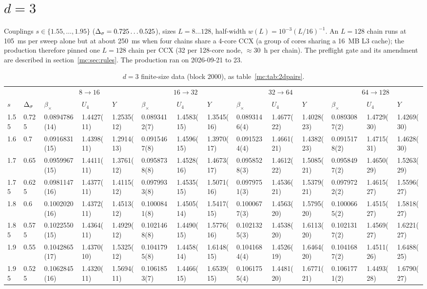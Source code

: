 \section{\texorpdfstring{$d=3$}{d=3}}\label{mc:sec:3d}
Couplings $s\in\{1.55,\dots,1.95\}$ ($\Delta_\sigma=0.725\dots0.525$), sizes $L=8\dots128$, half-width $w(L)=10^{-3}(L/16)^{-1}$. An $L=128$ chain runs at
105~ms per sweep alone but at about 250~ms when four chains share a 4-core CCX (a group of cores sharing a 16~MB L3 cache); the production
therefore pinned one $L=128$ chain per CCX (32 per 128-core node, $\approx30$~h per chain). The preflight gate and its amendment are described in
section~\ref{mc:sec:rules}. The production ran on 2026-09-21 to 23.
\begin{table}\centering\scriptsize
\caption{$d=3$ finite-size data (block 2000), as table~\ref{mc:tab:2dpairs}.}\label{mc:tab:3dpairs}
\begin{tabular}{@{}ll|lll|lll|lll|lll@{}}\toprule
 & & \multicolumn{3}{c|}{$8\to16$} & \multicolumn{3}{c|}{$16\to32$} & \multicolumn{3}{c|}{$32\to64$} & \multicolumn{3}{c}{$64\to128$}\\
$s$ & $\Delta_\sigma$ & $\beta_\times$ & $U_4$ & $Y$ & $\beta_\times$ & $U_4$ & $Y$ & $\beta_\times$ & $U_4$ & $Y$ & $\beta_\times$ & $U_4$ & $Y$ \\\midrule
1.55 & 0.725 & 0.0894786(14) & 1.4427(11) & 1.2535(12) & 0.0893412(7) & 1.4583(15) & 1.3545(16) & 0.0893146(4) & 1.4677(22) & 1.4028(23) & 0.0893087(2) & 1.4729(30) & 1.4269(30) \\
1.6 & 0.7 & 0.0916831(15) & 1.4398(11) & 1.2914(13) & 0.0915467(8) & 1.4596(15) & 1.3970(17) & 0.0915234(4) & 1.4661(21) & 1.4382(23) & 0.0915178(2) & 1.4715(31) & 1.4628(30) \\
1.7 & 0.65 & 0.0959967(15) & 1.4411(11) & 1.3761(12) & 0.0958738(8) & 1.4528(16) & 1.4673(17) & 0.0958528(3) & 1.4612(22) & 1.5085(21) & 0.0958497(2) & 1.4650(29) & 1.5263(29) \\
1.75 & 0.625 & 0.0981147(16) & 1.4377(11) & 1.4115(12) & 0.0979933(8) & 1.4535(15) & 1.5071(16) & 0.0979751(3) & 1.4536(21) & 1.5379(21) & 0.0979722(2) & 1.4615(27) & 1.5596(27) \\
1.8 & 0.6 & 0.1002020(16) & 1.4372(11) & 1.4513(12) & 0.1000841(8) & 1.4505(14) & 1.5417(15) & 0.1000677(3) & 1.4563(20) & 1.5795(20) & 0.1000665(2) & 1.4515(27) & 1.5818(27) \\
1.85 & 0.575 & 0.1022550(15) & 1.4364(11) & 1.4929(12) & 0.1021468(8) & 1.4490(15) & 1.5776(16) & 0.1021325(3) & 1.4538(20) & 1.6113(20) & 0.1021317(2) & 1.4569(27) & 1.6221(27) \\
1.9 & 0.55 & 0.1042865(17) & 1.4370(10) & 1.5325(12) & 0.1041795(8) & 1.4458(14) & 1.6148(15) & 0.1041684(4) & 1.4526(19) & 1.6464(20) & 0.1041687(2) & 1.4511(26) & 1.6488(25) \\
1.95 & 0.525 & 0.1062845(16) & 1.4320(11) & 1.5694(11) & 0.1061853(7) & 1.4466(15) & 1.6539(15) & 0.1061755(4) & 1.4481(20) & 1.6771(21) & 0.1061771(2) & 1.4493(28) & 1.6790(27) \\
\bottomrule\end{tabular}
\end{table}
